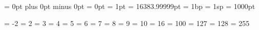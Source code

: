 
\newcount   \scratchcounter   \newcount  \globalscratchcounter
\newdimen   \scratchdimen     \newdimen  \globalscratchdimen
\newskip    \scratchskip      \newskip   \globalscratchskip
\newmuskip  \scratchmuskip    \newmuskip \globalscratchmuskip
\newtoks    \scratchtoks      \newtoks   \globalscratchtoks
\newbox     \scratchbox       \newbox    \globalscratchbox

\newcount\scratchcounterone  \newcount\scratchcountertwo  \newcount\scratchcounterthree
\newdimen  \scratchdimenone  \newdimen  \scratchdimentwo  \newdimen  \scratchdimenthree
\newdimen   \scratchskipone  \newdimen   \scratchskiptwo  \newdimen   \scratchskipthree
\newbox   \scratchmuskipone  \newbox   \scratchmuskiptwo  \newbox   \scratchmuskipthree
\newtoks    \scratchtoksone  \newtoks    \scratchtokstwo  \newtoks    \scratchtoksthree
\newbox      \scratchboxone  \newbox      \scratchboxtwo  \newbox      \scratchboxthree


\newskip \zeroskip     \zeroskip     = 0pt plus 0pt minus 0pt
\newdimen\zeropoint    \zeropoint    = 0pt
\newdimen\onepoint     \onepoint     = 1pt
\newdimen\maxdimen     \maxdimen     = 16383.99999pt
\newdimen\onebasepoint \onebasepoint = 1bp
\newdimen\scaledpoint  \scaledpoint  = 1sp
\newdimen\thousandpoint\thousandpoint= 1000pt

\let\points\onepoint

\newtoks \emptytoks


\newcount   \minustwo \minustwo =    -2
\chardef    \plustwo            =     2
\chardef    \plusthree          =     3
\chardef    \plusfour           =     4
\chardef    \plusfive           =     5
\chardef    \plussix            =     6
\chardef    \plusseven          =     7
\chardef    \pluseight          =     8
\chardef    \plusnine           =     9
\chardef    \plusten            =    10
\chardef    \plussixteen        =    16
\chardef    \plushundred        =   100
\chardef    \pluscxxvii         =   127
\chardef    \pluscxxviii        =   128
\chardef    \pluscclv           =   255

